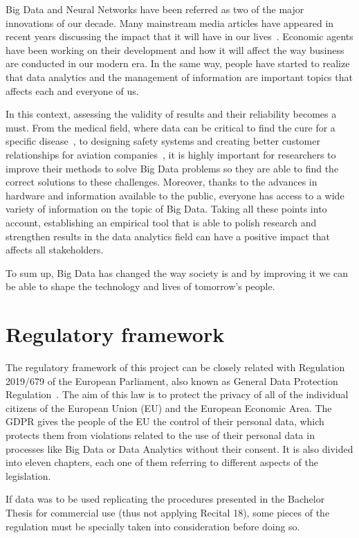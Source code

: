 Big Data and Neural Networks have been referred as two of the major innovations of our decade. Many mainstream media articles have appeared in recent years discussing the impact that it will have in our lives~\cite{Forbes_Article}. Economic agents have been working on their development and how it will affect the way business are conducted in our modern era. In the same way, people have started to realize that data analytics and the management of information are important topics that affects each and everyone of us.

In this context, assessing the validity of results and their reliability becomes a must. From the medical field, where data can be critical to find the cure for a specific disease~\cite{Nature_Article}, to designing safety systems and creating better customer relationships for aviation companies~\cite{Article_Aviation}, it is highly important for researchers to improve their methods to solve Big Data problems so they are able to find the correct solutions to these challenges. Moreover, thanks to the advances in hardware and information available to the public, everyone has access to a wide variety of information on the topic of Big Data. Taking all these points into account, establishing an empirical tool that is able to polish research and strengthen results in the data analytics field can have a positive impact that affects all stakeholders.

To sum up, Big Data has changed the way society is and by improving it we can be able to shape the technology and lives of tomorrow's people.

\section{Regulatory framework}

The regulatory framework of this project can be closely related with Regulation 2019/679 of the European Parliament, also known as General Data Protection Regulation~\cite{GDPR}. The aim of this law is to protect the privacy of all of the individual citizens of the European Union (EU) and the European Economic Area. The GDPR gives the people of the EU the control of their personal data, which protects them from violations related to the use of their personal data in processes like Big Data or Data Analytics without their consent. It is also divided into eleven chapters, each one of them referring to different aspects of the legislation. 

If data was to be used replicating the procedures presented in the Bachelor Thesis for commercial use (thus not applying Recital 18), some pieces of the regulation must be specially taken into consideration before doing so. %


